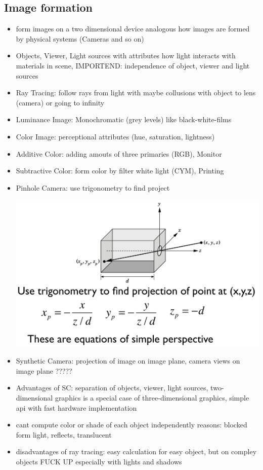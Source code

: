 \documentclass[11pt,a4paper]{article}
\begin{document}
	\subsection{Image formation}
		\begin{itemize}
			\item form images on a two dimensional device analogous how images are formed by physical systems (Cameras and so on)
			\item Objects, Viewer, Light sources with attributes how light interacts with materials in scene, IMPORTEND: independence of object, viewer and light sources
			\item Ray Tracing: follow rays from light with maybe collusions with object to lens (camera) or going to infinity
			\item Luminance Image: Monochromatic (grey levels) like black-white-films
			\item Color Image: perceptional attributes (hue, saturation, lightness)
			\item Additive Color: adding amouts of three primaries (RGB), Monitor
			\item Subtractive Color: form color by filter white light (CYM), Printing
			\item Pinhole Camera: use trigonometry to find project 
			\begin{center}
				\includegraphics[scale=0.3]{pictures/pic1.jpg}
			\end{center}
			\item Synthetic Camera: projection of image on image plane, camera views on image plane ?????
			\item Advantages of SC: separation of objects, viewer, light sources, two-dimensional graphics is a special case of three-dimensional graphics, simple api with fast hardware implementation
			\item cant compute color or shade of each object independently reasons: blocked form light, reflects, translucent
			\item disadvantages of ray tracing: easy calculation for easy object, but on compley objects FUCK UP especially with lights and shadows
		\end{itemize}
\end{document}
